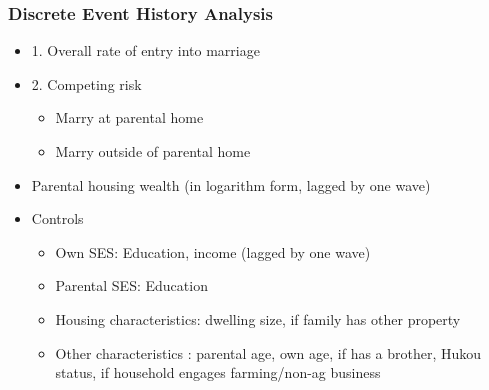 \documentclass{beamer}
\begin{document}
\begin{frame}


\frametitle{Discrete Event History Analysis}
\begin{itemize}
    \item  1. Overall rate of entry into marriage 
     \item 2.  Competing risk
       \begin{itemize}
           \item Marry at parental home 
           \item Marry outside of parental home 
       \end{itemize}

       \pause  
     \item Parental housing wealth (in logarithm form, lagged by one wave)
    
    \pause
     \item Controls 
    \begin{itemize}
       \item Own SES: Education, income (lagged by one wave)
        \item Parental SES: Education 
       \item Housing characteristics: dwelling size, if family has other property 
       \item Other characteristics : parental age, own age, if has a brother, Hukou status, if household engages farming/non-ag business 
    \end{itemize}
    

\end{itemize}

\end{frame}

\end{document}
